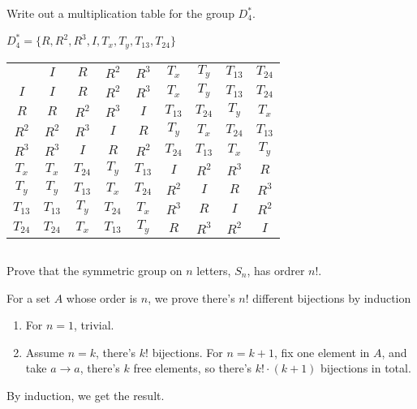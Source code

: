 $$ $$

\begin{ex}
    Write out a multiplication table for the group $D_4^*$.
\end{ex}

\begin{answer}
    $D_4^*=\{R,R^{2}, R^{3},I,T_x,T_y,T_{13},T_{24}\}$
    \begin{table}[H]
        \centering
        \begin{tabular}{c|cccccccc}
        \multicolumn{1}{c}{} & $I$ & $R$ & $R^{2}$ & $R^{3}$ & $T_x$ & $T_y$ & $T_{13}$ & $T_{24}$  \\ 
        \cline{2-9}
        $I$ & $I$ & $R$ & $R^{2}$ & $R^{3}$ & $T_x$ & $T_y$ & $T_{13}$ &  $T_{24}$ \\
        $R$ & $R$ & $R^{2}$ & $R^{3}$ & $I$ & $T_{13}$ & $T_{24}$ & $T_y$ & $T_x$  \\
        $R^{2}$ & $R^{2}$ & $R^{3}$ & $I$ & $R$  & $T_y$ & $T_x$ & $T_{24}$ & $T_{13}$  \\
        $R^{3}$ & $R^{3}$ & $I$ & $R$  & $R^{2}$ & $T_{24}$ & $T_{13}$ & $T_x$ & $T_y$  \\
        $T_x$ & $T_x$ & $T_{24}$ & $T_y$ & $T_{13}$ & $I$ & $R^{2}$ & $R^{3}$ & $R$  \\
        $T_y$ & $T_y$ & $T_{13}$ & $T_x$ & $T_{24}$ & $R^{2}$ & $I$ & $R$ & $R^{3}$  \\
        $T_{13}$ & $T_{13}$ & $T_y$ & $T_{24}$ & $T_x$ & $R^{3}$ & $R$ & $I$ &  $R^{2}$ \\
        $T_{24}$ & $T_{24}$ & $T_x$ & $T_{13}$ & $T_y$ & $R$ & $R^{3}$ & $R^{2}$ &  $I$
        \end{tabular}
        \end{table}
\end{answer}

$$ $$

\begin{ex}
    Prove that the symmetric group on $n$ letters, $S_n$, has ordrer $n!$.
\end{ex}

\begin{answer}
    For a set $A$ whose order is $n$, we prove there's $n!$ different bijections by induction
    \begin{enumerate}
        \item For $n=1$, trivial.
        \item Assume $n=k$, there's $k!$ bijections. For $n=k+1$, fix one element in $A$, and take $a\to a$, there's $k$ free elements, so there's $k!\cdot(k+1)$ bijections in total.
    \end{enumerate}
    By induction, we get the result.
\end{answer}

